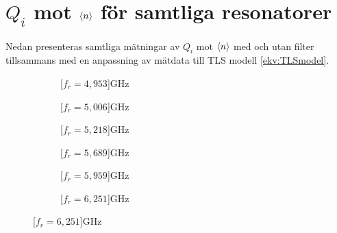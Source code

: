 \documentclass[../../main.tex]{subfiles}
\begin{document}
\chapter{$Q_i$ mot $\expval{n}$ för samtliga resonatorer}
\label{app:data}

Nedan presenteras samtliga mätningar av $Q_i$ mot $\expval{n}$ med och utan filter tillsammans med en anpassning av mätdata till TLS modell \eqref{ekv:TLSmodel}.


\begin{figure}[H]
    \begin{subfigure}{0.33\textwidth}
        \centering
        \setlength{}
        \setlength\figureheight{10em}
        
        \caption{\unit[$f_r=4,953$]{GHz}}
    \end{subfigure}
    \begin{subfigure}{0.33\textwidth}
        \centering
        \setlength{}
        \setlength\figureheight{10em}
        
        \caption{\unit[$f_r=5,006$]{GHz}}
    \end{subfigure}
    \begin{subfigure}{0.33\textwidth}
        \centering
        \setlength{}
        \setlength\figureheight{10em}
        
        \caption{\unit[$f_r=5,218$]{GHz}}
    \end{subfigure}

    \begin{subfigure}{0.33\textwidth}
        \centering
        \setlength{}
        \setlength\figureheight{10em}
        
        \caption{\unit[$f_r=5,689$]{GHz}}
    \end{subfigure}
    \begin{subfigure}{0.33\textwidth}
        \centering
        \setlength{}
        \setlength\figureheight{10em}
        
        \caption{\unit[$f_r=5,959$]{GHz}}
    \end{subfigure}
    \begin{subfigure}{0.33\textwidth}
        \centering
        \setlength{}
        \setlength\figureheight{10em}
        
        \caption{\unit[$f_r=6,251$]{GHz}}
    \end{subfigure}


\end{figure}
\end{document}
